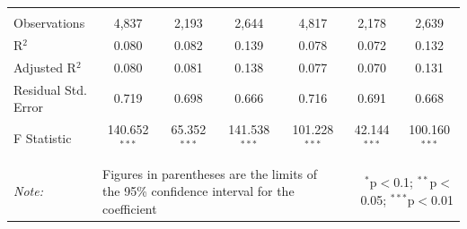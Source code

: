 \documentclass[alpha-refs]{wiley-article-01g}
\begin{document}
\begin{landscape}
\begin{table}[!htbp]
\begin{tabular}{@{\extracolsep{5pt}}lcccccc}
  & & & & & & \\ 
\hline \\[-3ex] 
Observations & 4,837 & 2,193 & 2,644 & 4,817 & 2,178 & 2,639 \\ 
R$^{2}$ & 0.080 & 0.082 & 0.139 & 0.078 & 0.072 & 0.132 \\ 
Adjusted R$^{2}$ & 0.080 & 0.081 & 0.138 & 0.077 & 0.070 & 0.131 \\ 
Residual Std. Error & 0.719 & 0.698 & 0.666 & 0.716 & 0.691 & 0.668 \\ 
F Statistic & 140.652$^{***}$ & 65.352$^{***}$ & 141.538$^{***}$ & 101.228$^{***}$ & 42.144$^{***}$ & 100.160$^{***}$ \\ 
\hline 
\hline \\[-3ex] 
\textit{Note:} &\multicolumn{4}{l}{Figures in parentheses are the limits of the 95\% confidence interval for the coefficient}  & \multicolumn{2}{r}{$^{*}$p$<$0.1; $^{**}$p$<$0.05; $^{***}$p$<$0.01} \\ 
\end{tabular} 
\end{table} 

\end{landscape}

\newpage
\end{document}
